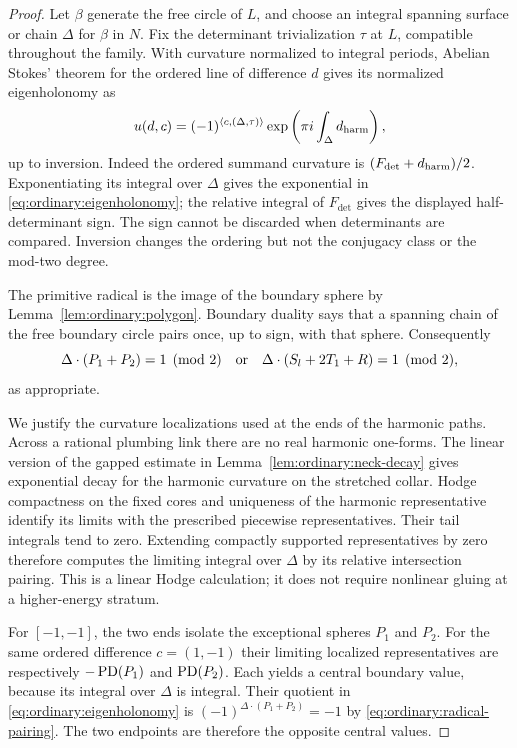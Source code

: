 \begin{proof}
Let $\beta$ generate the free circle of $L$, and choose
an integral spanning surface or chain $\Delta$ for $\beta$
in $N$.  Fix the determinant trivialization $\tau$ at
$L$, compatible throughout the family.  With curvature
normalized to integral periods, Abelian Stokes' theorem
for the ordered line of difference $d$ gives its
normalized eigenholonomy as
\begin{equation}\label{eq:ordinary:eigenholonomy}
 u(d,c)=(-1)^{\langle c,(\Delta,\tau)\rangle}
              \exp\left(\pi i\int_\Delta d_{\rm harm}\right),
\end{equation}
up to inversion.  Indeed the ordered summand curvature
is $(F_{\det}+d_{\rm harm})/2$.  Exponentiating its
integral over $\Delta$ gives the exponential in
\eqref{eq:ordinary:eigenholonomy}; the relative integral
of $F_{\det}$ gives the displayed half-determinant sign.
The sign cannot be discarded when determinants are
compared.  Inversion changes the ordering but not the
conjugacy class or the mod-two degree.

The primitive radical is the image of the boundary
sphere by Lemma~\ref{lem:ordinary:polygon}.  Boundary
duality says that a spanning chain of the free boundary
circle pairs once, up to sign, with that sphere.
Consequently
\begin{equation}\label{eq:ordinary:radical-pairing}
 \Delta\cdot(P_1+P_2)=1\pmod2
 \quad\hbox{or}\quad
 \Delta\cdot(S_l+2T_1+R)=1\pmod2,
\end{equation}
as appropriate.

We justify the curvature localizations used at the
ends of the harmonic paths.  Across a rational
plumbing link there are no real harmonic one-forms.
The linear version of the gapped estimate in
Lemma~\ref{lem:ordinary:neck-decay} gives exponential
decay for the harmonic curvature on the stretched
collar.  Hodge compactness on the fixed cores and
uniqueness of the harmonic representative identify its
limits with the prescribed piecewise representatives.
Their tail integrals tend to zero.  Extending compactly
supported representatives by zero therefore computes
the limiting integral over $\Delta$ by its relative
intersection pairing.  This is a linear Hodge
calculation; it does not require nonlinear gluing at
a higher-energy stratum.

For $[-1,-1]$, the two ends isolate the exceptional
spheres $P_1$ and $P_2$.  For the same ordered difference
$c=(1,-1)$ their limiting localized representatives are
respectively $-\operatorname{PD}(P_1)$ and $\operatorname{PD}(P_2)$.  Each yields
a central boundary value, because its integral over
$\Delta$ is integral.  Their quotient in
\eqref{eq:ordinary:eigenholonomy} is
$(-1)^{\Delta\cdot(P_1+P_2)}=-1$ by
\eqref{eq:ordinary:radical-pairing}.  The two endpoints
are therefore the opposite central values.


\end{proof}
